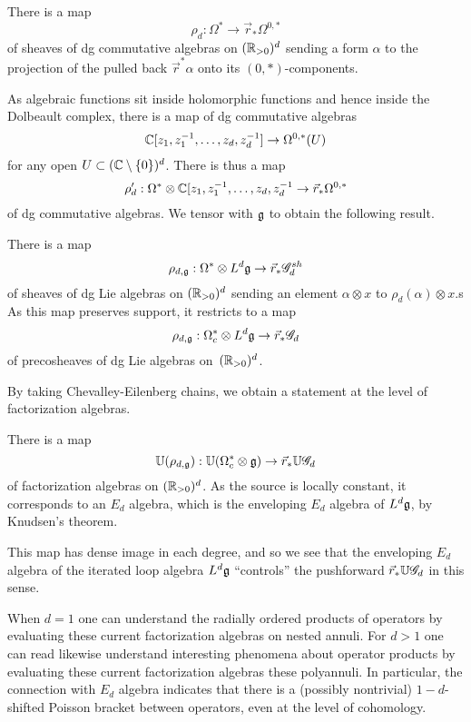 \begin{lem}
There is a map 
\[
\rho_{d}: \Omega^*  \to \vec{r}_* \Omega^{0,*}
\]
of sheaves of dg commutative algebras on $(\mathbb R_{>0})^d$ sending a form $\alpha$ to the projection of the pulled back $\vec{r}^* \alpha$ onto its $(0,*)$-components.
\end{lem}

As algebraic functions sit inside holomorphic functions and hence inside the Dolbeault complex,
there is a map of dg commutative algebras
\[
\mathbb C[z_1, z_1^{-1}, \ldots, z_d,z_d^{-1}] \to \Omega^{0,*}(U)
\]
for any open $U \subset (\mathbb C\setminus\{0\})^d$.
There is thus a map 
\[
\rho_{d}': \Omega^* \otimes \mathbb C[z_1, z_1^{-1}, \ldots, z_d,z_d^{-1} \to \vec{r}_* \Omega^{0,*}
\]
of dg commutative algebras.
We tensor with $\mathfrak g$ to obtain the following result.

\begin{lem}
There is a map
\[
\rho_{d,\mathfrak g}: \Omega^* \otimes L^d\mathfrak g \to \vec{r}_* \mathscr G_d^{sh}
\]
of sheaves of dg Lie algebras on $(\mathbb R_{>0})^d$ sending an element $\alpha \otimes x$ to $\rho_d(\alpha) \otimes x$.s
As this map preserves support, it restricts to a map  
\[
\rho_{d,\mathfrak g}: \Omega^*_c \otimes L^d\mathfrak g \to \vec{r}_* \mathscr G_d
\]
of precosheaves of dg Lie algebras on~$(\mathbb R_{>0})^d$.
\end{lem}

By taking Chevalley-Eilenberg chains, we obtain a statement at the level of factorization algebras.

\begin{cor}
There is a map
\[
\mathbb U(\rho_{d,\mathfrak g}): \mathbb U(\Omega^*_c \otimes \mathfrak g) \to \vec{r}_* \mathbb U\mathscr G_d
\]
of factorization algebras on $(\mathbb R_{>0})^d$.
As the source is locally constant, it corresponds to an $E_d$ algebra, 
which is the enveloping $E_d$ algebra of $L^d\mathfrak g$, by Knudsen's theorem.
\end{cor}

This map has dense image in each degree, and so we see that the enveloping $E_d$ algebra of the iterated loop algebra $L^d \mathfrak g$ ``controls'' the pushforward $\vec{r}_* \mathbb U\mathscr G_d$ in this sense.

\begin{rmk}
When $d=1$ one can understand the radially ordered products of operators by evaluating these current factorization algebras on nested annuli.
For $d >1$ one can read likewise understand interesting phenomena about operator products by evaluating these current factorization algebras these polyannuli.
In particular, the connection with $E_d$ algebra indicates that there is a (possibly nontrivial) $1-d$-shifted Poisson bracket between operators, even at the level of cohomology.
\end{rmk}

